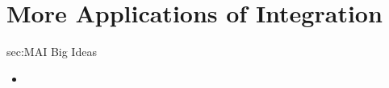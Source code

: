 \chapter{More Applications of Integration}
\label{chap:MAI}

\begin{bigideas}{sec:MAI Big Ideas}
\begin{itemize}
  \item 
\end{itemize}
\end{bigideas}
